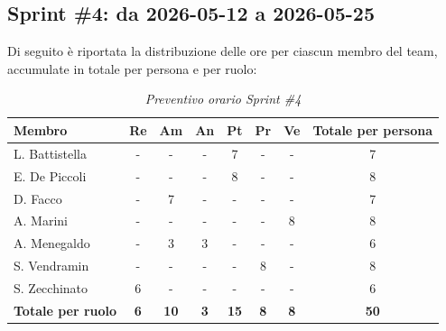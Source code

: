 \documentclass[a4paper, 10pt, colorlinks=true, linkcolor=black, urlcolor=blue, citecolor=blue, hidelinks]{article}
\renewcommand{\arraystretch}{1.2}
\begin{document}
\subsection{Sprint \#4: da 2026-05-12 a 2026-05-25}
Di seguito è riportata la distribuzione delle ore per ciascun membro del team,
accumulate in totale per persona e per ruolo:
\begin{table}[H]
    \centering
    \renewcommand{\arraystretch}{1.4}
    \begin{tabular}{|l|c|c|c|c|c|c|c|}
        \hline
        \rowcolor{bluBitless!15}
        \textbf{Membro} & \textbf{Re} & \textbf{Am} & \textbf{An} & \textbf{Pt} & \textbf{Pr} & \textbf{Ve} & \textbf{Totale per persona} \\
        \hline
        L. Battistella & - & - & - & 7 & - & - & 7 \\ \hline
        E. De Piccoli & - & - & - & 8 & - & - & 8 \\ \hline
        D. Facco & - & 7 & - & - & - & - & 7 \\ \hline
        A. Marini & - & - & - & - & - & 8 & 8 \\ \hline
        A. Menegaldo & - & 3 & 3 & - & - & - & 6 \\ \hline
        S. Vendramin & - & - & - & - & 8 & - & 8 \\ \hline
        S. Zecchinato & 6 & - & - & - & - & - & 6 \\ \hline
        \rowcolor{bluBitless!8}
        \textbf{Totale per ruolo} & \textbf{6} & \textbf{10} & \textbf{3} & \textbf{15} & \textbf{8} & \textbf{8} & \textbf{50} \\
        \hline
    \end{tabular}
    \caption{\textit{Preventivo orario Sprint \#4}}
\end{table}
\end{document}
